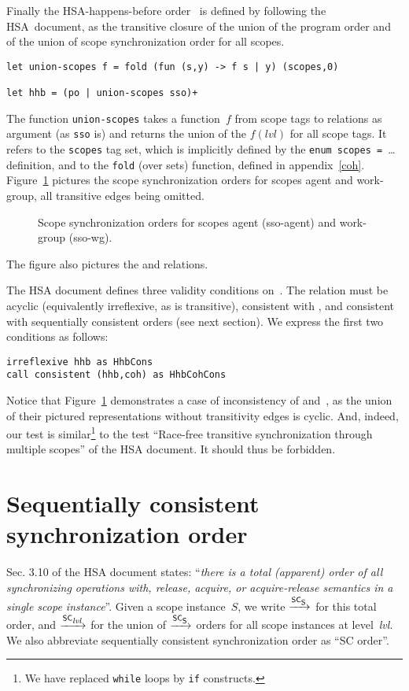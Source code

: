 \documentclass[a4paper]{article}
\begin{document}
Finally the HSA-happens-before order~\hhb{}
is defined by following the HSA~document,
as the transitive closure of the union of the program order and of
the union of scope synchronization order for all scopes.
\begin{verbatim}
let union-scopes f = fold (fun (s,y) -> f s | y) (scopes,0)

let hhb = (po | union-scopes sso)+
\end{verbatim}
The function \texttt{union-scopes} takes a function~$f$ from scope
tags to relations as argument (as \texttt{sso} is)
and returns the union of the \texttt{$f(\textit{lvl})$} for all scope tags.
It refers to the \texttt{scopes} tag set, which is implicitly defined
by the \verb+enum scopes = +\ldots{} definition, and to the
\verb+fold+ (over sets) function, defined in appendix~\ref{coh}.
Figure~\ref{isa2sso} pictures the scope synchronization orders
for scopes agent and work-group, all transitive edges being omitted.
\begin{figure}
\caption{\label{isa2sso}Scope synchronization orders for scopes agent (\textsf{sso-agent}) and work-group (\textsf{sso-wg}).}
\begin{center}\hspace*{-2cm}\end{center}
\end{figure}
The figure also pictures the \hhb{} and \coh{} relations.

The HSA document defines three validity conditions on~\hhb.
The \hhb{} relation must be acyclic (equivalently irreflexive, as \hhb{} is
transitive), consistent with \coh{}, and consistent with sequentially consistent
orders (see next section).
We express the first two conditions as follows:
\begin{verbatim}
irreflexive hhb as HhbCons
call consistent (hhb,coh) as HhbCohCons
\end{verbatim}
Notice that Figure~\ref{isa2sso} demonstrates a case of inconsistency
of \hhb{} and~\coh{},
as the union of their pictured representations without transitivity edges is
cyclic. And, indeed, our  test
is similar\footnote{We have replaced \texttt{while} loops by \texttt{if} constructs.} to the test
``Race-free transitive synchronization through multiple scopes''
of the HSA document. It should thus be forbidden.

\section{Sequentially consistent synchronization order}
Sec. 3.10 of the HSA document states: ``\emph{there is a
total (apparent) order of all synchronizing operations with,
release, acquire, or acquire-release semantics in a single scope instance}''.
Given a scope instance~$S$, we write $\xrightarrow{\textsf{\scriptsize{}SC$_{\textsf{\scriptsize{}{\ensuremath{}S}}}$}}$ for this total order,
and $\xrightarrow{\textsf{\scriptsize{}SC$_{\textsf{\scriptsize{}{\it\scriptsize{}lvl}}}$}}$ for the union of  $\xrightarrow{\textsf{\scriptsize{}SC$_{\textsf{\scriptsize{}{\ensuremath{}S}}}$}}$ orders for all scope instances
at level~\textit{lvl}. We also abbreviate
sequentially consistent synchronization order as ``SC order''.
\end{document}
